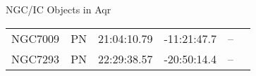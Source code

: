 \begin{block}{NGC/IC Objects in Aqr}
  \centering
  \begin{tabularx}{\textwidth}{llrrll} \toprule 
    NGC7009 & PN & 21:04:10.79 & -11:21:47.7  & -- \\ 
    NGC7293 & PN & 22:29:38.57 & -20:50:14.4  & -- \\ 
  \end{tabularx}
\end{block}